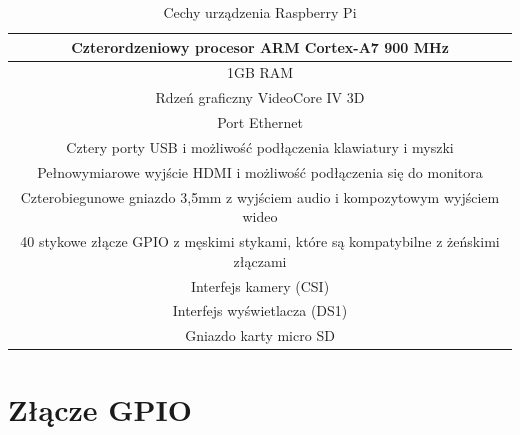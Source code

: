 \begin{table}[htbp]
\centering
\caption{Cechy urządzenia Raspberry Pi}
\begin{tabular}{|c|}
\hline
Czterordzeniowy procesor ARM Cortex-A7 900 MHz \\
\hline
1GB RAM \\
\hline
Rdzeń graficzny VideoCore IV 3D \\
\hline
Port Ethernet \\
\hline
Cztery porty USB i możliwość podłączenia klawiatury i myszki \\
\hline
Pełnowymiarowe wyjście HDMI i możliwość podłączenia się do monitora \\
\hline
Czterobiegunowe gniazdo 3,5mm z wyjściem audio i kompozytowym wyjściem wideo \\
\hline
40 stykowe złącze GPIO z męskimi stykami, które są kompatybilne z żeńskimi złączami \\
\hline
Interfejs kamery (CSI) \\
\hline
Interfejs wyświetlacza (DS1) \\
\hline
Gniazdo karty micro SD \\
\hline
\end{tabular}
\end{table}

\section{Złącze GPIO}

